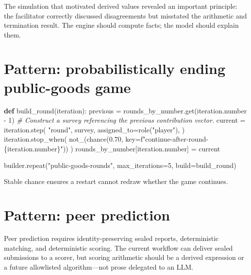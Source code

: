 \documentclass[
  10pt,
]{report}
\newenvironment{Shaded}{}{}
\newcommand{\CommentTok}[1]{\textcolor[rgb]{0.38,0.63,0.69}{\textit{#1}}}
\newcommand{\DecValTok}[1]{\textcolor[rgb]{0.25,0.63,0.44}{#1}}
\newcommand{\FloatTok}[1]{\textcolor[rgb]{0.25,0.63,0.44}{#1}}
\newcommand{\KeywordTok}[1]{\textcolor[rgb]{0.00,0.44,0.13}{\textbf{#1}}}
\newcommand{\NormalTok}[1]{#1}
\newcommand{\OperatorTok}[1]{\textcolor[rgb]{0.40,0.40,0.40}{#1}}
\newcommand{\SpecialCharTok}[1]{\textcolor[rgb]{0.25,0.44,0.63}{#1}}
\newcommand{\SpecialStringTok}[1]{\textcolor[rgb]{0.73,0.40,0.53}{#1}}
\newcommand{\StringTok}[1]{\textcolor[rgb]{0.25,0.44,0.63}{#1}}
\begin{document}
The simulation that motivated derived values revealed an important
principle: the facilitator correctly discussed disagreements but
misstated the arithmetic and termination result. The engine should
compute facts; the model should explain them.

\chapter{Pattern: probabilistically ending public-goods
game}\label{pattern-probabilistically-ending-public-goods-game}

\begin{Shaded}
\begin{Highlighting}[]
\KeywordTok{def}\NormalTok{ build\_round(iteration):}
\NormalTok{    previous }\OperatorTok{=}\NormalTok{ rounds\_by\_number.get(iteration.number }\OperatorTok{{-}} \DecValTok{1}\NormalTok{)}
    \CommentTok{\# Construct a survey referencing the previous contribution vector.}
\NormalTok{    current }\OperatorTok{=}\NormalTok{ iteration.step(}
        \StringTok{"round"}\NormalTok{,}
\NormalTok{        survey,}
\NormalTok{        assigned\_to}\OperatorTok{=}\NormalTok{role(}\StringTok{"player"}\NormalTok{),}
\NormalTok{    )}
\NormalTok{    iteration.stop\_when(}
\NormalTok{        not\_(chance(}\FloatTok{0.70}\NormalTok{, key}\OperatorTok{=}\SpecialStringTok{f"continue{-}after{-}round{-}}\SpecialCharTok{\{}\NormalTok{iteration}\SpecialCharTok{.}\NormalTok{number}\SpecialCharTok{\}}\SpecialStringTok{"}\NormalTok{))}
\NormalTok{    )}
\NormalTok{    rounds\_by\_number[iteration.number] }\OperatorTok{=}\NormalTok{ current}

\NormalTok{builder.repeat(}\StringTok{"public{-}goods{-}rounds"}\NormalTok{, max\_iterations}\OperatorTok{=}\DecValTok{5}\NormalTok{, build}\OperatorTok{=}\NormalTok{build\_round)}
\end{Highlighting}
\end{Shaded}

Stable chance ensures a restart cannot redraw whether the game
continues.

\chapter{Pattern: peer prediction}\label{pattern-peer-prediction}

Peer prediction requires identity-preserving sealed reports,
deterministic matching, and deterministic scoring. The current workflow
can deliver sealed submissions to a scorer, but scoring arithmetic
should be a derived expression or a future allowlisted algorithm---not
prose delegated to an LLM.
\end{document}
